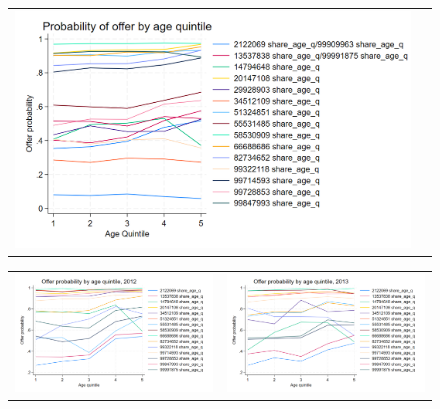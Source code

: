 \documentclass[12pt]{article}
\begin{document}
\begin{figure}[H] 
\caption{}
\label{fig:ie3_14}
\centering{}%
\begin{tabular}{cc}
\includegraphics[scale=0.27]{figures/IE3_supply_offerprob_age_q.png}
\end{tabular}
\end{figure}




\begin{figure}[H] 
\caption{}
\label{fig:ie3_15}
\centering{}%
\begin{tabular}{cc}
\includegraphics[scale=0.27]{figures/IE3_supply_offerprob_age_q_2012.png} &
\includegraphics[scale=0.27]{figures/IE3_supply_offerprob_age_q_2013.png}
\end{tabular}
\end{figure}
\end{document}
